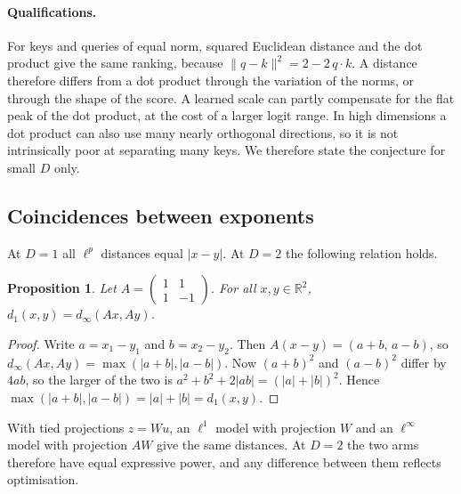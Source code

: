 \documentclass[11pt]{article}
\newtheorem{proposition}{Proposition}
\begin{document}
\begin{table}[h]
\centering\small

\caption{Greedy random packing of points with mutual distance at least the separation, on the unit sphere and in the unit ball. The ratio is the count in the ball divided by the count on the sphere.}
\label{tab:pack}
\end{table}

\paragraph{Qualifications.}
For keys and queries of equal norm, squared Euclidean distance and the dot product give the same ranking, because $\|q-k\|^2=2-2\,q\cdot k$.
A distance therefore differs from a dot product through the variation of the norms, or through the shape of the score.
A learned scale can partly compensate for the flat peak of the dot product, at the cost of a larger logit range.
In high dimensions a dot product can also use many nearly orthogonal directions, so it is not intrinsically poor at separating many keys.
We therefore state the conjecture for small $D$ only.

\subsection{Coincidences between exponents}

At $D=1$ all $\ell^p$ distances equal $|x-y|$.
At $D=2$ the following relation holds.

\begin{proposition}\label{prop:two}
Let $A=\begin{pmatrix}1&1\\1&-1\end{pmatrix}$. For all $x,y\in\mathbb{R}^2$, $d_1(x,y)=d_\infty(Ax,Ay)$.
\end{proposition}
\begin{proof}
Write $a=x_1-y_1$ and $b=x_2-y_2$.
Then $A(x-y)=(a+b,\,a-b)$, so $d_\infty(Ax,Ay)=\max(|a+b|,|a-b|)$.
Now $(a+b)^2$ and $(a-b)^2$ differ by $4ab$, so the larger of the two is $a^2+b^2+2|ab|=(|a|+|b|)^2$.
Hence $\max(|a+b|,|a-b|)=|a|+|b|=d_1(x,y)$.
\end{proof}

With tied projections $z=Wu$, an $\ell^1$ model with projection $W$ and an $\ell^\infty$ model with projection $AW$ give the same distances.
At $D=2$ the two arms therefore have equal expressive power, and any difference between them reflects optimisation.
\end{document}
